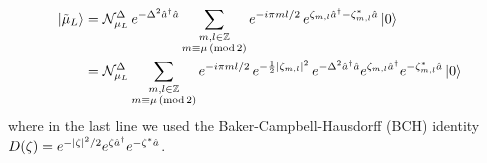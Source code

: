 \documentclass[11pt]{article}
\begin{document}
\begin{align*}
    \ket{\tilde{\mu}_L} & = \mathcal{N}_{\mu_L}^\Delta \, e^{-\Delta^2 \hat{a}^\dagger \hat{a}} \sum_{\substack{m, l \in \mathbb{Z} \\ m \equiv \mu \,(\mathrm{mod}\, 2)}} e^{-i \pi m l / 2} \, e^{\zeta_{m,l}\hat{a}^\dagger - \zeta_{m,l}^* \hat{a}} \ket{0} \\
                        & = \mathcal{N}_{\mu_L}^\Delta \sum_{\substack{m, l \in \mathbb{Z}                                          \\ m \equiv \mu \,(\mathrm{mod}\, 2)}} e^{-i \pi m l / 2} \, e^{-\frac{1}{2} \abs{\zeta_{m,l}}^2} \, e^{-\Delta^2 \hat{a}^\dagger \hat{a}} e^{\zeta_{m,l}\hat{a}^\dagger} e^{- \zeta_{m,l}^* \hat{a}} \ket{0}
\end{align*}
where in the last line we used the Baker-Campbell-Hausdorff (BCH) identity $D(\zeta) = e^{-\abs{\zeta}^2/2} e^{\zeta \hat{a}^\dagger} e^{-\zeta^* \hat{a}}$.
\end{document}
